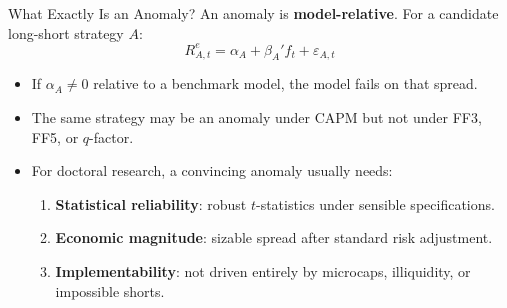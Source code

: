 \documentclass{beamer}
\begin{document}
\begin{frame}{What Exactly Is an Anomaly?}
	An anomaly is \textbf{model-relative}. For a candidate long-short strategy $A$:
	\begin{equation}
		R_{A,t}^e = \alpha_A + \beta_A' f_t + \varepsilon_{A,t}
	\end{equation}

	\begin{itemize}
		\item If $\alpha_A \neq 0$ relative to a benchmark model, the model fails on that spread.
		\item The same strategy may be an anomaly under CAPM but not under FF3, FF5, or $q$-factor.
		\item For doctoral research, a convincing anomaly usually needs:
		\begin{enumerate}
			\item \textbf{Statistical reliability}: robust $t$-statistics under sensible specifications.
			\item \textbf{Economic magnitude}: sizable spread after standard risk adjustment.
			\item \textbf{Implementability}: not driven entirely by microcaps, illiquidity, or impossible shorts.
		\end{enumerate}
	\end{itemize}
\end{frame}
\end{document}
